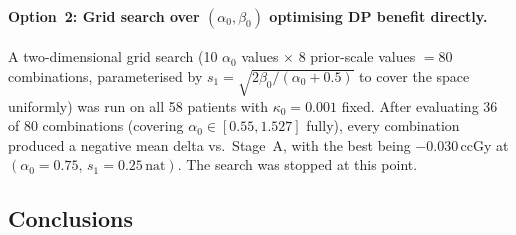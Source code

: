\documentclass[11pt]{article}
\begin{document}
\paragraph{Option~2: Grid search over $(\alpha_0, \beta_0)$ optimising DP benefit
directly.}
A two-dimensional grid search (10 $\alpha_0$ values $\times$ 8 prior-scale values
$= 80$ combinations, parameterised by $s_1 = \sqrt{2\beta_0/(\alpha_0+0.5)}$ to
cover the space uniformly) was run on all 58 patients with $\kappa_0 = 0.001$
fixed.  After evaluating 36 of 80 combinations (covering $\alpha_0 \in
[0.55, 1.527]$ fully), every combination produced a negative mean delta vs.\
Stage~A, with the best being $-0.030$\,ccGy at $(\alpha_0 = 0.75,\,
s_1 = 0.25\,\text{nat})$.  The search was stopped at this point.

\subsection{Conclusions}
\end{document}
